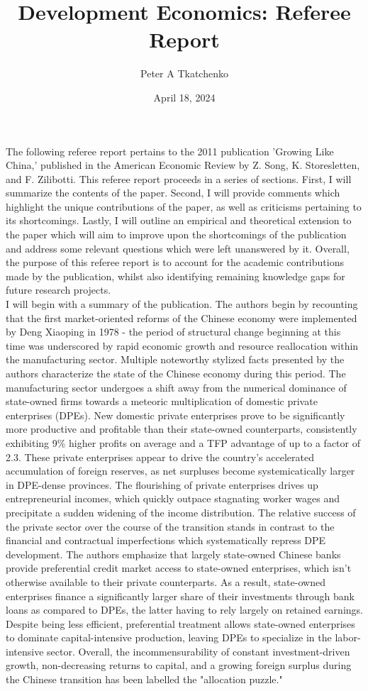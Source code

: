 \documentclass{article}
\title{Development Economics: Referee Report}
\author{Peter A Tkatchenko}
\date{April 18, 2024}
\begin{document}
\maketitle
The following referee report pertains to the 2011
publication 'Growing Like China,' published in the American
Economic Review by Z. Song, K. Storesletten, and F. Zilibotti.
This referee report proceeds in a series of sections. First,
I will summarize the contents of the paper. Second, I will 
provide comments which highlight the unique contributions
of the paper, as well as criticisms pertaining to its shortcomings.
Lastly, I will outline an empirical and theoretical extension
to the paper which will aim to improve upon the shortcomings
of the publication and address some relevant questions which were left
unanswered by it. Overall, the purpose of this referee report 
is to account for the academic contributions made by the publication,
whilst also identifying remaining knowledge gaps for future research projects.
\\

I will begin with a summary of the publication. The authors begin by 
recounting that the first market-oriented reforms of the Chinese economy
were implemented by Deng Xiaoping in 1978 - the period of structural change beginning 
at this time was underscored by rapid economic growth and resource reallocation within 
the manufacturing sector. Multiple noteworthy stylized facts presented by the authors characterize the 
state of the Chinese economy during this period. The manufacturing sector
undergoes a shift away from the numerical dominance of state-owned firms towards
a meteoric multiplication of domestic private enterprises (DPEs). New domestic private enterprises 
prove to be significantly more productive and profitable than their state-owned counterparts, 
consistently exhibiting 9\% higher profits on average and a TFP advantage of up to a factor of 2.3.
These private enterprises appear to drive the country's accelerated accumulation of foreign reserves, 
as net surpluses become systemicatically larger in DPE-dense provinces. The flourishing 
of private enterprises drives up entrepreneurial incomes, which quickly outpace stagnating worker wages and 
precipitate a sudden widening of the income distribution. The relative success of the private sector 
over the course of the transition stands in contrast to the financial and contractual imperfections 
which systematically repress DPE development. The authors emphasize that largely state-owned Chinese banks provide preferential 
credit market access to state-owned enterprises, which isn't otherwise available to their 
private counterparts. As a result, state-owned enterprises finance a significantly larger share of their investments
through bank loans as compared to DPEs, the latter having to rely largely on retained earnings. Despite being less efficient,
preferential treatment allows state-owned enterprises to dominate capital-intensive production, leaving DPEs to specialize
in the labor-intensive sector. Overall, the incommensurability of constant investment-driven growth, non-decreasing returns to capital,
and a growing foreign surplus during the Chinese transition has been labelled the "allocation puzzle." 
\\
\end{document}
